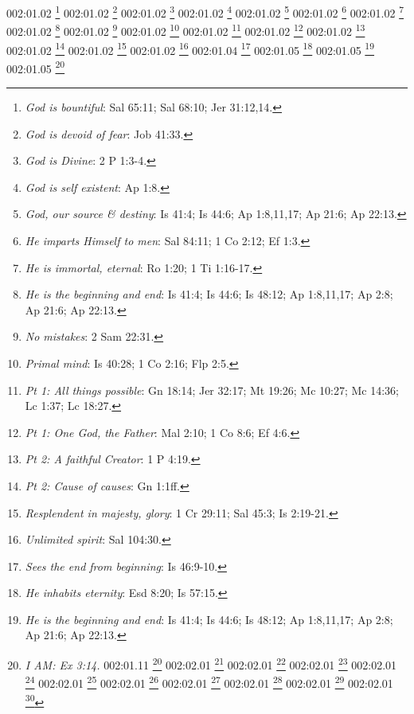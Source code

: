 {002:01.02 \footnote{\textit{God is bountiful}: Sal 65:11; Sal 68:10; Jer 31:12,14.}
002:01.02 \footnote{\textit{God is devoid of fear}: Job 41:33.}
002:01.02 \footnote{\textit{God is Divine}: 2 P 1:3-4.}
002:01.02 \footnote{\textit{God is self existent}: Ap 1:8.}
002:01.02 \footnote{\textit{God, our source & destiny}: Is 41:4; Is 44:6; Ap 1:8,11,17; Ap 21:6; Ap 22:13.}
002:01.02 \footnote{\textit{He imparts Himself to men}: Sal 84:11; 1 Co 2:12; Ef 1:3.}
002:01.02 \footnote{\textit{He is immortal, eternal}: Ro 1:20; 1 Ti 1:16-17.}
002:01.02 \footnote{\textit{He is the beginning and end}: Is 41:4; Is 44:6; Is 48:12; Ap 1:8,11,17; Ap 2:8; Ap 21:6; Ap 22:13.}
002:01.02 \footnote{\textit{No mistakes}: 2 Sam 22:31.}
002:01.02 \footnote{\textit{Primal mind}: Is 40:28; 1 Co 2:16; Flp 2:5.}
002:01.02 \footnote{\textit{Pt 1: All things possible}: Gn 18:14; Jer 32:17; Mt 19:26; Mc 10:27; Mc 14:36; Lc 1:37; Lc 18:27.}
002:01.02 \footnote{\textit{Pt 1: One God, the Father}: Mal 2:10; 1 Co 8:6; Ef 4:6.}
002:01.02 \footnote{\textit{Pt 2: A faithful Creator}: 1 P 4:19.}
002:01.02 \footnote{\textit{Pt 2: Cause of causes}: Gn 1:1ff.}
002:01.02 \footnote{\textit{Resplendent in majesty, glory}: 1 Cr 29:11; Sal 45:3; Is 2:19-21.}
002:01.02 \footnote{\textit{Unlimited spirit}: Sal 104:30.}
002:01.04 \footnote{\textit{Sees the end from beginning}: Is 46:9-10.}
002:01.05 \footnote{\textit{He inhabits eternity}: Esd 8:20; Is 57:15.}
002:01.05 \footnote{\textit{He is the beginning and end}: Is 41:4; Is 44:6; Is 48:12; Ap 1:8,11,17; Ap 2:8; Ap 21:6; Ap 22:13.}
002:01.05 \footnote{\textit{I AM: Ex 3:14.}
002:01.11 \footnote{\textit{In Him we live & move}: Hch 17:28.}
002:02.01 \footnote{\textit{Declares end from beginning}: Is 46:10.}
002:02.01 \footnote{\textit{Eternal life}: Dn 12:2; Mt 19:16,29; Mt 25:46; Mc 10:17,30; Lc 10:25; Lc 18:18,30; Jn 3:15-16,36; Jn 4:14,36; Jn 5:24,39; Jn 6:27,40,47; Jn 6:54,68; Jn 8:51-52; Jn 10:28; Jn 11:25-26; Jn 12:25,50; Jn 17:2-3; Hch 13:46-48; Ro 2:7; Ro 5:21; Ro 6:22-23; Gl 6:8; 1 Ti 1:16; 1 Ti 6:12,19; Tit 1:2; Tit 3:7; 1 Jn 1:2; 1 Jn 2:25; 1 Jn 3:15; 1 Jn 5:13,20; Jud 1:21; Ap 22:5.}
002:02.01 \footnote{\textit{Eternal purpose}: Ef 3:11.}
002:02.01 \footnote{\textit{Father of lights}: Stg 1:17.}
002:02.01 \footnote{\textit{Gives to all life}: Hch 17:25.}
002:02.01 \footnote{\textit{God is changeless}: Is 25:1; Mal 3:6.}
002:02.01 \footnote{\textit{I am Lord, change not}: Mal 3:6.}
002:02.01 \footnote{\textit{My counsel shall stand}: Is 46:10.}
002:02.01 \footnote{\textit{No varibleness, changing}: Stg 1:17.}
002:02.01 \footnote{\textit{Pt 1: God has life in himself}: Jn 5:26.}
}}
